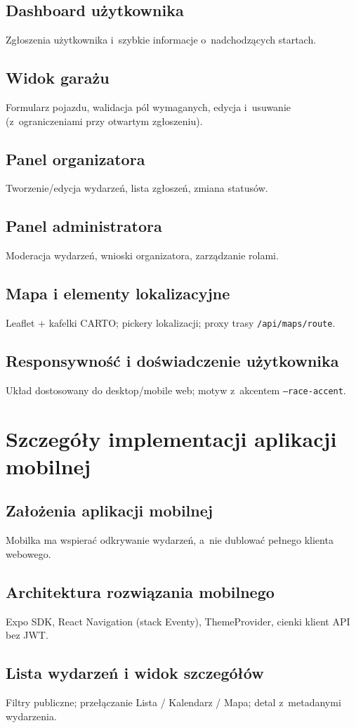 \documentclass{sprz}
\begin{document}
\section{Dashboard użytkownika}
Zgłoszenia użytkownika i~szybkie informacje o~nadchodzących startach.
\section{Widok garażu}
Formularz pojazdu, walidacja pól wymaganych, edycja i~usuwanie (z~ograniczeniami przy otwartym zgłoszeniu).
\section{Panel organizatora}
Tworzenie/edycja wydarzeń, lista zgłoszeń, zmiana statusów.
\section{Panel administratora}
Moderacja wydarzeń, wnioski organizatora, zarządzanie rolami.
\section{Mapa i elementy lokalizacyjne}
Leaflet + kafelki CARTO; pickery lokalizacji; proxy trasy \texttt{/api/maps/route}.
\section{Responsywność i doświadczenie użytkownika}
Układ dostosowany do desktop/mobile web; motyw z~akcentem \texttt{--race-accent}.

\chapter{Szczegóły implementacji aplikacji mobilnej}
\section{Założenia aplikacji mobilnej}
Mobilka ma wspierać odkrywanie wydarzeń, a~nie dublować pełnego klienta webowego.
\section{Architektura rozwiązania mobilnego}
Expo SDK, React Navigation (stack Eventy), ThemeProvider, cienki klient API bez JWT.
\section{Lista wydarzeń i widok szczegółów}
Filtry publiczne; przełączanie Lista / Kalendarz / Mapa; detal z~metadanymi wydarzenia.
\end{document}
